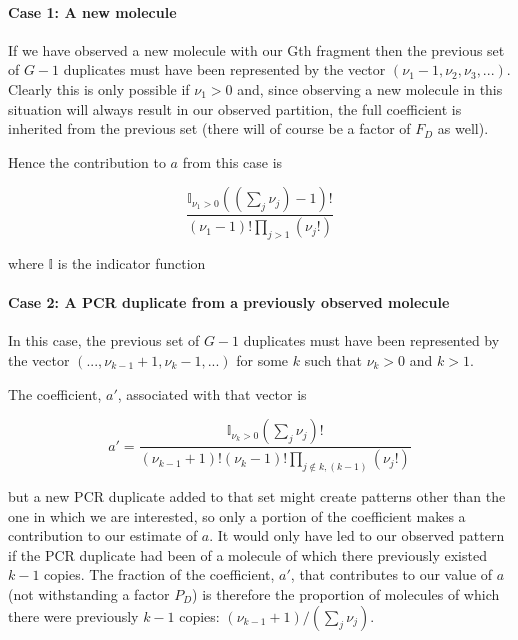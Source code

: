 \documentclass{article}
\begin{document}
\paragraph{Case 1: A new molecule}

If we have observed a new molecule with our Gth fragment then the previous set of $G-1$ duplicates must have been represented by the vector $(\nu_1-1, \nu_2, \nu_3, ...)$. Clearly this is only possible if $\nu_1>0$ and, since observing a new molecule in this situation will always result in our observed partition, the full coefficient is inherited from the previous set (there will of course be a factor of $F_D$ as well).

Hence the contribution to $a$ from this case is 

\begin{equation} \label{eq:case1}
\frac{\mathbb{I}_{\nu_1>0} \left(\left( \sum_j  \nu_j \right)-1\right)! }
{\left(\nu_1 - 1 \right)!\prod_{j>1} \left( \nu_j! \right)}
\end{equation}

\noindent where $\mathbb{I}$ is the indicator function

\paragraph{Case 2: A PCR duplicate from a previously observed molecule}

In this case, the previous set of $G-1$ duplicates must have been represented by the vector $( ..., \nu_{k-1} +1, \nu_k -1, ...)$ for some $k$ such that $\nu_k > 0$ and $k>1$. 

The coefficient, $a'$, associated with that vector is  

\begin{equation}
a' = \frac{\mathbb{I}_{\nu_k > 0} \left(\sum_j  \nu_j \right)!}{\left(\nu_{k-1} + 1 \right)! \left(\nu_k - 1 \right)!\prod_{j \notin k,(k-1)} \left( \nu_j! \right)}
\end{equation}

\noindent but a new PCR duplicate added to that set might create patterns other than the one in which we are interested, so only a portion of the coefficient makes a contribution to our estimate of $a$. It would only have led to our observed pattern if the PCR duplicate had been of a molecule of which there previously existed $k-1$ copies. The fraction of the coefficient, $a'$, that contributes to our value of $a$ (not withstanding a factor $P_D$) is therefore the proportion of molecules of which there were previously $k-1$ copies: $\left(\nu_{k-1}+1 \right)/\left( \sum_j  \nu_j \right)$.
\end{document}
